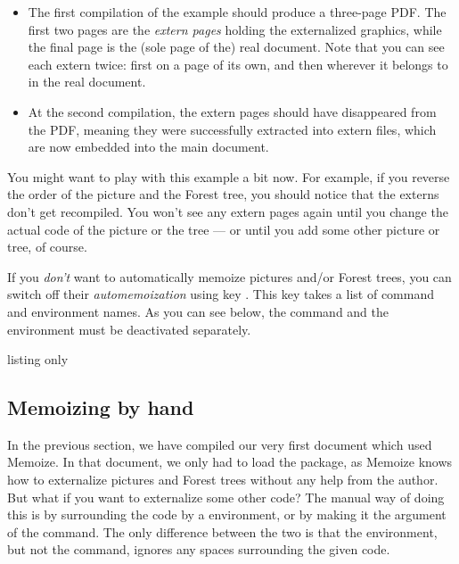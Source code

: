 \documentclass[a4paper,11pt]{article}
\begin{document}
\begin{itemize}
\item The first compilation of the example should produce a three-page PDF.
  The first two pages are the \emph{extern pages} holding the externalized
  graphics, while the final page is the (sole page of the) real document.  Note
  that you can see each extern twice: first on a page of its own, and then
  wherever it belongs to in the real document.
\item At the second compilation, the extern pages should have disappeared from
  the PDF, meaning they were successfully extracted into extern files, which
  are now embedded into the main document.
\end{itemize}


You might want to play with this example a bit now.
For example, if you reverse the order of the \TikZ picture and the Forest
tree, you should notice that the externs don't get recompiled.  You won't see
any extern pages again until you change the actual code of the picture or the
tree --- or until you add some other picture or tree, of course.

If you \emph{don't} want to automatically memoize \TikZ pictures and/or Forest
trees, you can switch off their \emph{automemoization} using key
.  This key takes a list of command and environment
names.  As you can see below, the command and the environment must be
deactivated separately.

\begin{tcblisting}{listing only}
\end{tcblisting}


\subsection{Memoizing by hand}
\label{sec:tut:memoize}

In the previous section, we have compiled our very first document which used
Memoize.  In that document, we only had to load the package, as Memoize knows
how to externalize \TikZ pictures and Forest trees without any help from the
author.  But what if you want to externalize some other code?  The manual way of
doing this is by surrounding the code by a  environment,
or by making it the argument of the  command.  The only
difference between the two is that the environment, but not the command,
ignores any spaces surrounding the given code.
\end{document}
